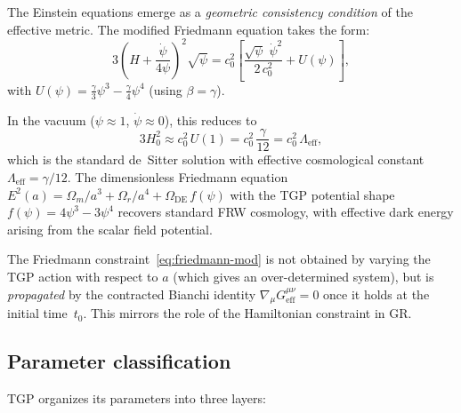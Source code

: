 The Einstein equations emerge as a \emph{geometric consistency
condition} of the effective metric.  The modified Friedmann
equation takes the form:
\begin{equation}\label{eq:friedmann-mod}
  \boxed{
    3\!\left(H + \frac{\dot\psi}{4\psi}\right)^{\!2}\!\sqrt{\psi}
    = c_{0}^{2}\!\left[
      \frac{\sqrt{\psi}\;\dot\psi^{2}}{2\,c_{0}^{2}}
      + U(\psi)
    \right],
  }
\end{equation}
with $U(\psi) = \frac{\gamma}{3}\psi^{3} - \frac{\gamma}{4}\psi^{4}$
(using $\beta=\gamma$).

In the vacuum ($\psi\approx 1$, $\dot\psi\approx 0$), this reduces to
\begin{equation}
  3H_{0}^{2} \approx c_{0}^{2}\,U(1)
  = c_{0}^{2}\,\frac{\gamma}{12}
  = c_{0}^{2}\,\Lambda_{\mathrm{eff}},
\end{equation}
which is the standard de~Sitter solution with effective cosmological
constant $\Lambda_{\mathrm{eff}}=\gamma/12$.  The dimensionless
Friedmann equation $E^{2}(a)=\Omega_{m}/a^{3}+\Omega_{r}/a^{4}
+\Omega_{\mathrm{DE}}\,f(\psi)$ with the TGP potential shape
$f(\psi)=4\psi^{3}-3\psi^{4}$ recovers standard FRW cosmology,
with effective dark energy arising from the scalar field potential.

\begin{remark}
The Friedmann constraint~\eqref{eq:friedmann-mod} is not obtained
by varying the TGP action with respect to $a$ (which gives an
over-determined system), but is \emph{propagated} by the contracted
Bianchi identity $\nabla_{\mu}G^{\mu\nu}_{\mathrm{eff}}=0$ once
it holds at the initial time~$t_{0}$.
This mirrors the role of the Hamiltonian constraint in GR.
\end{remark}

\subsection{Parameter classification}\label{ssec:params}

TGP organizes its parameters into three layers:

